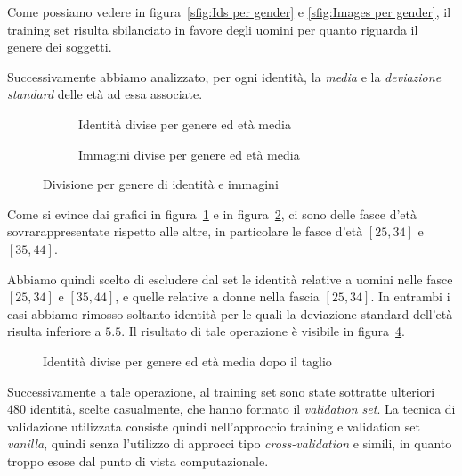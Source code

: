 Come possiamo vedere in figura~\ref{sfig:Ids per gender} e \ref{sfig:Images per gender}, il training set risulta sbilanciato in favore degli uomini per quanto riguarda il genere dei soggetti.

Successivamente abbiamo analizzato, per ogni identità, la \emph{media} e la \emph{deviazione standard} delle età ad essa associate.

\begin{figure}[ht]

\begin{subfigure}{0.5\textwidth}
\def\svgscale{0.42}

\caption{Identità divise per genere ed età media}
\label{sfig:Ids per gender and mean age}
\end{subfigure}
\begin{subfigure}{0.5\textwidth}
\def\svgscale{0.42}

\caption{Immagini divise per genere ed età media}
\label{sfig:Images per gender and mean age}
\end{subfigure}
\caption{Divisione per genere di identità e immagini}
\label{fig:gender_age_division}
\end{figure}

Come si evince dai grafici in figura~\ref{sfig:Ids per gender and mean age} e in figura~\ref{sfig:Images per gender and mean age}, ci sono delle fasce d'età sovrarappresentate rispetto alle altre, in particolare le fasce d'età $[25,34]$ e $[35,44]$.

Abbiamo quindi scelto di escludere dal set le identità relative a uomini nelle fasce $[25,34]$ e $[35,44]$, e quelle relative a donne nella fascia $[25,34]$. In entrambi i casi abbiamo rimosso soltanto identità per le quali la deviazione standard dell'età risulta inferiore a $5.5$. Il risultato di tale operazione è visibile in figura~\ref{fig:Ids per gender and mean age after the drop}.

\begin{figure}[ht]
\centering
\def\svgscale{0.7}

\caption{Identità divise per genere ed età media dopo il taglio}
\label{fig:Ids per gender and mean age after the drop}
\end{figure}

Successivamente a tale operazione, al training set sono state sottratte ulteriori $480$ identità, scelte casualmente, che hanno formato il \emph{validation set}. La tecnica di validazione utilizzata consiste quindi nell'approccio training e validation set \emph{vanilla}, quindi senza l'utilizzo di approcci tipo \emph{cross-validation} e simili, in quanto troppo esose dal punto di vista computazionale.

